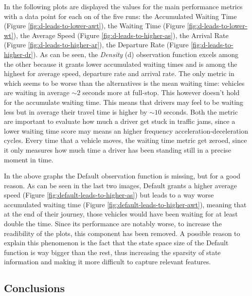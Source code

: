 In the following plots are displayed the values for the main performance metrics with a data point for each on of the five runs: the Accumulated Waiting Time (Figure \ref{fig:d-leads-to-lower-awt}), the Waiting Time (Figure \ref{fig:d-leads-to-lower-wt}), the Average Speed (Figure \ref{fig:d-leads-to-higher-as}), the Arrival Rate (Figure \ref{fig:d-leads-to-higher-ar}), the Departure Rate (Figure \ref{fig:d-leads-to-higher-dr}).
As can be seen, the \textit{Density} (d) observation function excels among the other because it grants lower accumulated waiting times and is among the highest for average speed, departure rate and arrival rate.
The only metric in which seems to be worse than the alternatives is the mean waiting time: vehicles are waiting in average $\sim2$ seconds more at full-stop.
This however doesn't hold for the accumulate waiting time.
This means that drivers may feel to be waiting less but in average their travel time is higher by $\sim10$ seconds.
Both the metric are important to evaluate how much a driver get stuck in traffic jams, since a lower waiting time score may means an higher frequency acceleration-deceleration cycles.
Every time that a vehicle moves, the waiting time metric get zeroed, since it only measures how much time a driver has been standing still in a precise moment in time.


In the above graphs the Default observation function is missing, but for a good reason.
As can be seen in the last two images, Default grants a higher average speed (Figure \ref{fig:default-leads-to-higher-as}) but leads to a way worse accumulated waiting time (Figure \ref{fig:default-leads-to-higher-awt}), meaning that at the end of their journey, those vehicles would have been waiting for at least double the time.
Since its performance are notably worse, to increase the readibility of the plots, this component has been removed.
A possible reason to explain this phenomenon is the fact that the state space size of the Default function is way bigger than the rest, thus increasing the sparsity of state information and making it more difficult to capture relevant features.


\subsection{Conclusions}

